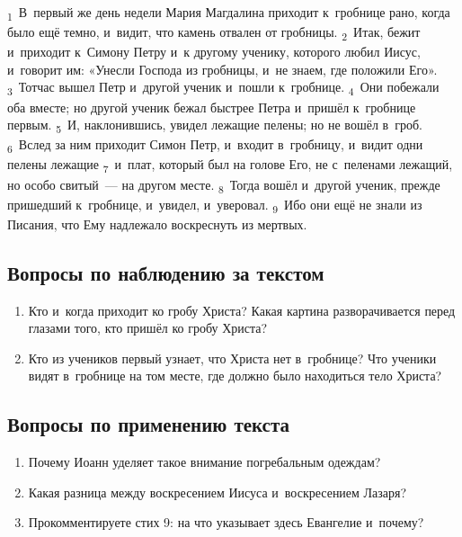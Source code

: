 \documentclass[a4paper,12pt]{article}
\begin{document}
\textsubscript{1}~В~первый же день недели Мария Магдалина приходит к~гробнице рано, когда было ещё темно, и~видит, что камень отвален от гробницы. \textsubscript{2}~Итак, бежит и~приходит к~Симону Петру и~к другому ученику, которого любил Иисус, и~говорит им: «Унесли Господа из гробницы, и~не знаем, где положили Его». \textsubscript{3}~Тотчас вышел Петр и~другой ученик и~пошли к~гробнице. \textsubscript{4}~Они побежали оба вместе; но другой ученик бежал быстрее Петра и~пришёл к~гробнице первым. \textsubscript{5}~И, наклонившись, увидел лежащие пелены; но не вошёл в~гроб. \textsubscript{6}~Вслед за ним приходит Симон Петр, и~входит в~гробницу, и~видит одни пелены лежащие \textsubscript{7}~и~плат, который был на голове Его, не с~пеленами лежащий, но особо свитый~--- на другом месте. \textsubscript{8}~Тогда вошёл и~другой ученик, прежде пришедший к~гробнице, и~увидел, и~уверовал. \textsubscript{9}~Ибо они ещё не знали из Писания, что Ему надлежало воскреснуть из мертвых. 

\subsection*{Вопросы по наблюдению за текстом}
\begin{enumerate}
    \item Кто и~когда приходит ко гробу Христа? Какая картина разворачивается перед глазами того, кто пришёл ко гробу Христа? 
    
    \myline
    
    \myline
    \item Кто из учеников первый узнает, что Христа нет в~гробнице? Что ученики видят в~гробнице на том месте, где должно было находиться тело Христа? 
    
    \myline
    
    \myline
\end{enumerate}

\subsection*{Вопросы по применению текста} 
\begin{enumerate}
    \item Почему Иоанн уделяет такое внимание погребальным одеждам? 
    
    \myline
    
    \myline
    \item Какая разница между воскресением Иисуса и~воскресением Лазаря? 
    
    \myline
    
    \myline
    \item Прокомментируете стих 9: на что указывает здесь Евангелие и~почему?
    
    \myline
    
    \myline
\end{enumerate}
\end{document}
